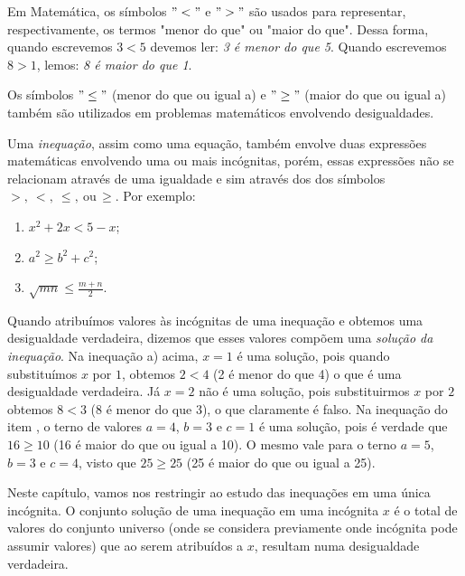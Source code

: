 Em Matemática, os símbolos $"<"$ e $">"$ são usados para representar, respectivamente, os termos "menor do que"{} ou "maior do que". Dessa forma, quando escrevemos $3<5$ devemos ler: \emph{3 é menor do que 5}. Quando escrevemos $8 > 1$, lemos: \emph{8 é maior do que 1}.

Os símbolos $"\leq"$ (menor do que ou igual a) e $"\geq"$ (maior do que ou igual a) também são utilizados em problemas matemáticos envolvendo desigualdades.

Uma \emph{inequação}, assim como uma equação, também envolve duas expressões matemáticas envolvendo uma ou mais incógnitas, porém, essas expressões não se relacionam através de uma igualdade e sim através dos dos símbolos $>, \ <, \ \leq,\ \mbox{ou} \, \geq$. Por exemplo:
\begin{enumerate}
\item{}
$x^2 + 2x < 5 - x$;

\item{}
$a^2 \geq b^2 + c^2$;

\item{}
$\sqrt{mn} \leq \frac{m+n}{2}.$
\end{enumerate}

Quando atribuímos valores às incógnitas de uma inequação e obtemos uma desigualdade verdadeira, dizemos que esses valores compõem uma \emph{solução da inequação}. Na inequação a) acima, $x = 1$ é uma solução, pois quando substituímos $x$ por $1$, obtemos $2<4$ (2 é menor do que 4) o que é uma desigualdade verdadeira. Já $x = 2$ não é uma solução, pois substituirmos $x$ por $2$ obtemos $8<3$ (8 é menor do que 3), o que claramente é falso. Na inequação do item , o terno de valores $a = 4$, $b=3$ e $c=1$ é uma solução, pois é verdade que $16\geq 10$ (16 é maior do que ou igual a 10). O mesmo vale para o terno $a = 5$, $b = 3$ e $c = 4$, visto que $25 \geq 25$ (25 é maior do que ou igual a 25).

Neste capítulo, vamos nos restringir ao estudo das inequações em uma única incógnita. O conjunto solução de uma inequação em uma incógnita $x$ é o total de valores do conjunto universo (onde se considera previamente onde incógnita pode assumir valores) que ao serem atribuídos a $x$, resultam numa desigualdade verdadeira.

